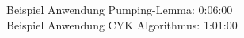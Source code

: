 \documentclass{article}
\begin{document}
Beispiel Anwendung Pumping-Lemma: 0:06:00 \\
Beispiel Anwendung CYK Algorithmus: 1:01:00 \\
\end{document}
